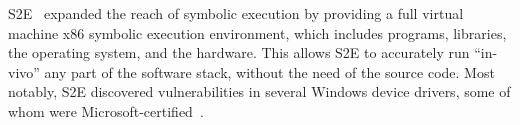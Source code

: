 S2E~\cite{s2eSystem} expanded the reach of symbolic execution by providing a full virtual machine x86 symbolic execution environment, which includes programs, libraries, the operating system, and the hardware.
%
This allows S2E to accurately run ``in-vivo'' any part of the software stack, without the need of the source code.
%
Most notably, S2E discovered vulnerabilities in several Windows device drivers, some of whom were Microsoft-certified~\cite{ddt}.





